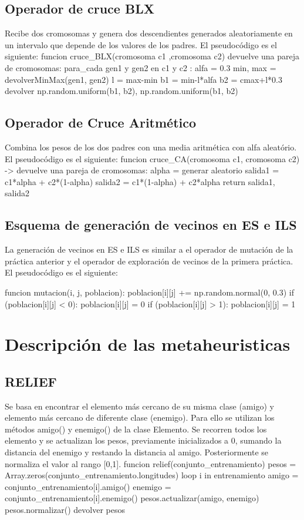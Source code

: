\documentclass[12pt, spanish]{article}
\begin{document}
\subsection{Operador de cruce BLX}
Recibe dos cromosomas y genera dos descendientes generados aleatoriamente en un intervalo que depende de los valores de los padres. El pseudocódigo es el siguiente: 
funcion cruce\_BLX(cromosoma c1 ,cromosoma c2) devuelve una pareja de cromosomas:
    para\_cada gen1 y gen2 en c1 y c2 :	
	alfa = 0.3
	min, max = devolverMinMax(gen1, gen2)
    	l = max-min
    	b1 = min-l*alfa
    	b2 = cmax+l*0.3
    devolver np.random.uniform(b1, b2), np.random.uniform(b1, b2)
\subsection{Operador de Cruce Aritmético}
Combina los pesos de los dos padres con una media aritmética con alfa aleatório. El pseudocódigo es el siguiente: 
funcion cruce\_CA(cromosoma c1, cromosoma c2) -> devuelve una pareja de cromosomas: 
    alpha = generar aleatorio 
    salida1 = c1*alpha + c2*(1-alpha)
    salida2 = c1*(1-alpha) + c2*alpha
    return salida1, salida2
\subsection{Esquema de generación de vecinos en ES e ILS}
La generación de vecinos en ES e ILS es similar a el operador de mutación de la práctica anterior y el operador de exploración de vecinos de la primera práctica. El pseudocódigo es el siguiente: 

funcion mutacion(i, j, poblacion):
  poblacion[i][j] += np.random.normal(0, 0.3)
  if (poblacion[i][j] < 0): poblacion[i][j] = 0
  if (poblacion[i][j] > 1): poblacion[i][j] = 1

\pagebreak


\section{Descripción de las metaheuristicas}
\subsection{RELIEF }
Se basa en encontrar el elemento más cercano de su misma clase (amigo) y elemento más cercano de diferente clase (enemigo). Para ello se utilizan los métodos amigo() y enemigo() de la clase Elemento. Se recorren todos los elemento y se actualizan los pesos, previamente inicializados a 0, sumando la distancia del enemigo y restando la distancia al amigo. Posteriormente se normaliza el valor al rango [0,1]. 
funcion relief(conjunto\_entrenamiento) {
	pesos = Array.zeros(conjunto\_entrenamiento.longitudes)
	loop i in entrenamiento {
		amigo = conjunto\_entrenamiento[i].amigo() 
		enemigo = conjunto\_entrenamiento[i].enemigo() 
		pesos.actualizar(amigo, enemigo) 
	}
	pesos.normalizar() 
	devolver pesos
}
\end{document}
